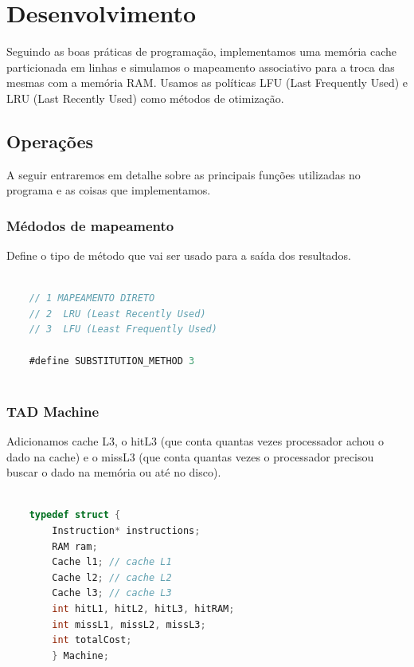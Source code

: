 \documentclass{article}
\begin{document}
\clearpage



\section{Desenvolvimento}

Seguindo as boas práticas de programação, implementamos uma memória cache particionada em linhas e simulamos o mapeamento associativo para a troca das mesmas com a memória RAM. Usamos as políticas LFU (Last Frequently Used) e LRU (Last Recently Used) como métodos de otimização.



\subsection{Operações}

A seguir entraremos em detalhe sobre as principais funções utilizadas no programa e as coisas que implementamos.

\subsubsection{Médodos de mapeamento}

Define o tipo de método que vai ser usado para a saída dos resultados.

\begin{lstlisting}[caption={Definição do tipo de método},label={lst:cod1},language=C]

    // 1 MAPEAMENTO DIRETO
    // 2  LRU (Least Recently Used)
    // 3  LFU (Least Frequently Used)

    #define SUBSTITUTION_METHOD 3
    
\end{lstlisting}

\subsubsection{TAD Machine}

Adicionamos cache L3, o hitL3 (que conta quantas vezes processador achou o dado na cache) e o missL3 (que conta quantas vezes o processador precisou buscar o dado na memória ou até no disco).

\begin{lstlisting}[caption={TAD Machine},label={lst:cod2},language=C]

    typedef struct {
        Instruction* instructions;
        RAM ram;
        Cache l1; // cache L1
        Cache l2; // cache L2
        Cache l3; // cache L3
        int hitL1, hitL2, hitL3, hitRAM;
        int missL1, missL2, missL3;
        int totalCost;
        } Machine;

    \end{lstlisting}
\end{document}

